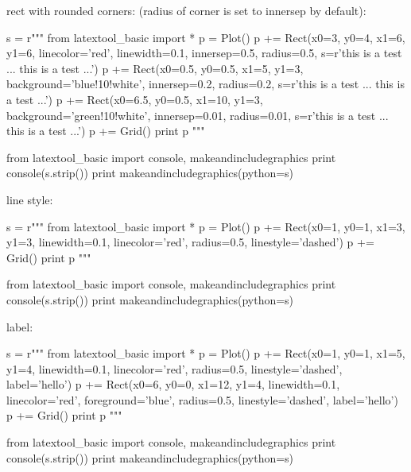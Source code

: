 rect with rounded corners:
(radius of corner is set to innersep by default):
\begin{python}
s = r"""
from latextool_basic import *
p = Plot()
p += Rect(x0=3, y0=4, x1=6, y1=6, linecolor='red', linewidth=0.1,
          innersep=0.5, radius=0.5, 
          s=r'{\tiny this is a test ... this is a test ...}')
p += Rect(x0=0.5, y0=0.5, x1=5, y1=3, 
          background='blue!10!white', 
          innersep=0.2, radius=0.2,
          s=r'{\tiny this is a test ... this is a test ...}')
p += Rect(x0=6.5, y0=0.5, x1=10, y1=3, 
          background='green!10!white', 
          innersep=0.01, radius=0.01,
          s=r'{\tiny this is a test ... this is a test ...}')
p += Grid()
print p
"""

from latextool_basic import console, makeandincludegraphics
print console(s.strip())
print makeandincludegraphics(python=s)
\end{python}



line style:
\begin{python}
s = r"""
from latextool_basic import *
p = Plot()
p += Rect(x0=1, y0=1, x1=3, y1=3,
          linewidth=0.1, linecolor='red',
          radius=0.5, linestyle='dashed')
p += Grid()
print p
"""

from latextool_basic import console, makeandincludegraphics
print console(s.strip())
print makeandincludegraphics(python=s)
\end{python}

label:
\begin{python}
s = r"""
from latextool_basic import *
p = Plot()
p += Rect(x0=1, y0=1, x1=5, y1=4,
          linewidth=0.1, linecolor='red',
          radius=0.5, linestyle='dashed', label='hello')
p += Rect(x0=6, y0=0, x1=12, y1=4,
          linewidth=0.1, linecolor='red',
          foreground='blue',
          radius=0.5, linestyle='dashed', label='hello')
p += Grid()
print p
"""

from latextool_basic import console, makeandincludegraphics
print console(s.strip())
print makeandincludegraphics(python=s)
\end{python}



